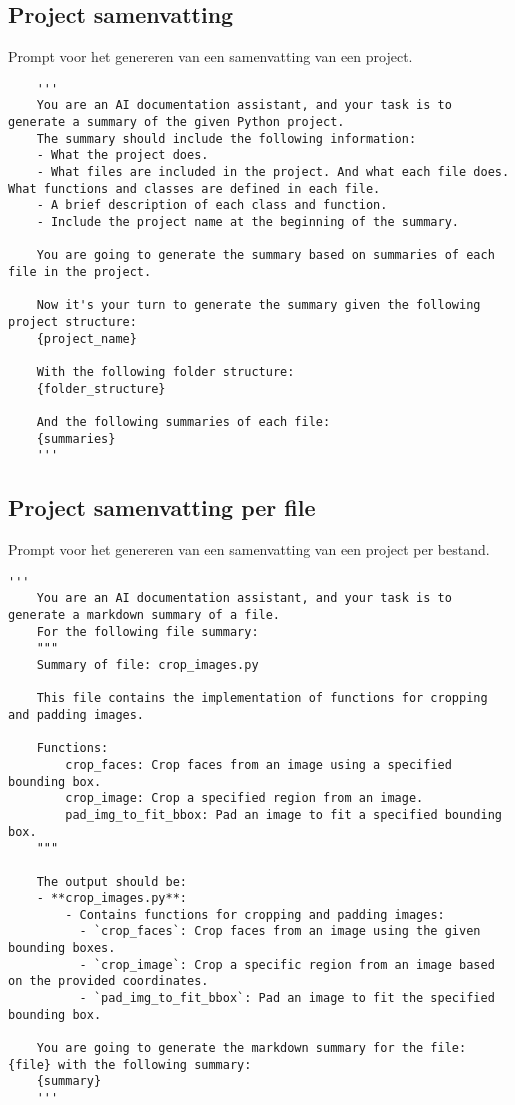 \subsection{Project samenvatting}
\label{bijlage:prompt6}
Prompt voor het genereren van een samenvatting van een project.
\begin{verbatim}
    '''
    You are an AI documentation assistant, and your task is to generate a summary of the given Python project.
    The summary should include the following information:
    - What the project does.
    - What files are included in the project. And what each file does. What functions and classes are defined in each file.
    - A brief description of each class and function.
    - Include the project name at the beginning of the summary.

    You are going to generate the summary based on summaries of each file in the project.
    
    Now it's your turn to generate the summary given the following project structure:
    {project_name}

    With the following folder structure:
    {folder_structure}

    And the following summaries of each file:
    {summaries}
    '''
\end{verbatim}

\subsection{Project samenvatting per file}
\label{bijlage:prompt7}
Prompt voor het genereren van een samenvatting van een project per bestand.
\begin{verbatim}
'''
    You are an AI documentation assistant, and your task is to generate a markdown summary of a file.
    For the following file summary:
    """
    Summary of file: crop_images.py

    This file contains the implementation of functions for cropping and padding images.

    Functions:
        crop_faces: Crop faces from an image using a specified bounding box.
        crop_image: Crop a specified region from an image.
        pad_img_to_fit_bbox: Pad an image to fit a specified bounding box.
    """

    The output should be:
    - **crop_images.py**: 
        - Contains functions for cropping and padding images:
          - `crop_faces`: Crop faces from an image using the given bounding boxes.
          - `crop_image`: Crop a specific region from an image based on the provided coordinates.
          - `pad_img_to_fit_bbox`: Pad an image to fit the specified bounding box.

    You are going to generate the markdown summary for the file: {file} with the following summary:
    {summary}
    '''
\end{verbatim}


